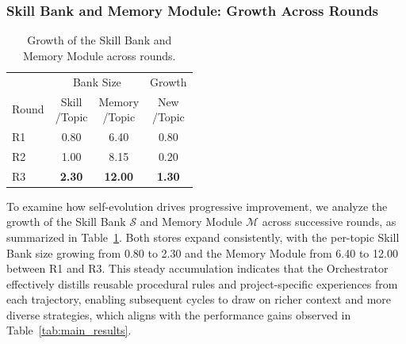 \documentclass{opendatalab}
\begin{document}
\subsubsection{Skill Bank and Memory Module: Growth Across Rounds}

\begin{table}
\centering
\caption{Growth of the Skill Bank and Memory Module across rounds.}
\label{tab:skill_memory_growth}
\footnotesize
\setlength{\tabcolsep}{9pt}
\renewcommand{\arraystretch}{0.95}
\begin{tabular}{l|cc|c}
\toprule
 & \multicolumn{2}{c|}{Bank Size} & Growth \\
\cmidrule{2-4}
Round 
 & \makecell{Skill\\/Topic} 
 & \makecell{Memory\\/Topic} 
 & \makecell{New\\/Topic} \\
\midrule
R1 & 0.80          & 6.40           & 0.80 \\
R2 & 1.00          & 8.15           & 0.20 \\
R3 & \textbf{2.30} & \textbf{12.00} & \textbf{1.30} \\
\bottomrule
\end{tabular}
\end{table}

To examine how self-evolution drives progressive improvement, we analyze the growth of the Skill Bank $\mathcal{S}$ and Memory Module $\mathcal{M}$ across successive rounds, as summarized in Table~\ref{tab:skill_memory_growth}. Both stores expand consistently, with the per-topic Skill Bank size growing from 0.80 to 2.30 and the Memory Module from 6.40 to 12.00 between R1 and R3. This steady accumulation indicates that the Orchestrator effectively distills reusable procedural rules and project-specific experiences from each trajectory, enabling subsequent cycles to draw on richer context and more diverse strategies, which aligns with the performance gains observed in Table~\ref{tab:main_results}.
\end{document}
